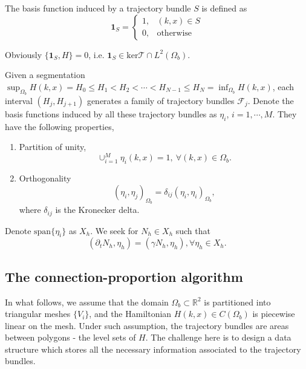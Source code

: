 \documentclass{article}
\newtheorem{theorem}{Theorem}
\numberwithin{equation}{section}
\begin{document}
The basis function induced by a trajectory bundle $S$ is defined as 
    \begin{equation}
        \mathbf{1}_{S}=\begin{cases}
        1, & (k,x)\in S\\
        0, & \text{otherwise}
        \end{cases}
    \end{equation} 

Obviously $\{\mathbf{1}_{S}, H\} = 0$, i.e. $\mathbf{1}_{S} \in \text{ker}\mathcal{T} \cap L^{2}(\Omega_{b})$.

\bigskip
Given a segmentation $\sup_{\Omega_{b}}H(k,x)=H_{0}\leq H_{1}<H_{2}<\cdots<H_{N-1}\leq H_{N}=\inf_{\Omega_{b}}H(k,x)$, each interval $\left(H_{j},H_{j+1}\right)$ generates a family of trajectory bundles $\mathcal{F}_{j}$. Denote the basis functions induced by all these trajectory bundles as $\eta_{i}$, $i=1, \cdots, M$. They have the following properties,

\begin{enumerate}
    \item Partition of unity,
    \begin{equation}
    \cup_{i=1}^{M}\eta_{i}(k,x)=1,\ \forall (k,x) \in \Omega_{b}.
    \end{equation}
    
    \item Orthogonality
    \begin{equation}
        \left(\eta_{i},\eta_{j}\right)_{\Omega_{b}}=\delta_{ij}\left(\eta_{i},\eta_{i}\right)_{\Omega_{b}},
    \end{equation}
    where $\delta_{ij}$ is the Kronecker delta.

\end{enumerate}

Denote $\text{span}\{\eta_{i}\}$ as $X_{h}$. We seek for $N_{h} \in X_{h}$ such that
\begin{equation}\label{discrete_reaction}
    \left(\partial_{t}N_{h},\eta_{h}\right)=\left(\gamma N_{h},\eta_{h}\right),\forall\eta_{h}\in X_{h}.
\end{equation}






\subsection{The connection-proportion algorithm}
In what follows, we assume that the domain $\Omega_b \subset \mathbb{R}^{2} $ is partitioned into triangular meshes $ \{V_{i} \}$, and the Hamiltonian $H(k,x) \in C(\Omega_{b})$ is piecewise linear on the mesh. Under such assumption, the trajectory bundles are areas between polygons - the level sets of $H$. The challenge here is to design a data structure which stores all the necessary information associated to the trajectory bundles.
\end{document}

